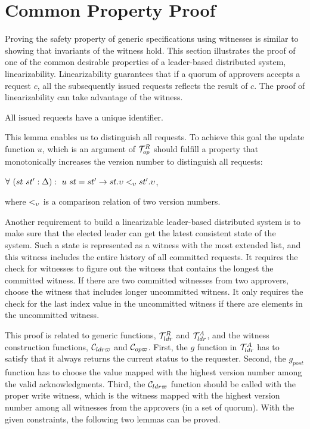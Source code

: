 \section{Common Property Proof}
\label{chapter:witnesspassing:sec:prove-safety-with-witness}

Proving the safety property of generic specifications using witnesses is similar to showing that invariants of the witness hold.
This section illustrates the proof of one of the common desirable properties
of a leader-based distributed system, linearizability.
Linearizability guarantees that if a quorum of approvers accepts a request $c$, 
all the subsequently issued requests reflects the result of $c$. 
The proof of linearizability can take advantage of the witness. 

\begin{lemma}
All issued requests have a unique identifier.
\end{lemma}

This lemma enables us to distinguish all requests. To achieve this goal the 
update function $u$, which is an argument of $\mathcal{T}^{R}_{op}$ should fulfill a 
property that monotonically increases the version number to distinguish all
requests:
\begin{center}
$\forall \ (st \ st' : \Delta) : \ u \ st = st' \rightarrow st.\upsilon
<_{\upsilon} st'.\upsilon$,
\end{center}
where $<_{\upsilon}$ is a comparison relation of two version numbers.


Another requirement to build a linearizable leader-based distributed system is to make sure that the elected leader can get the latest consistent
state of the system. Such a state is represented as a witness with the most extended list, and this witness includes the entire history of all committed requests. 
It requires the check for witnesses to figure out the witness that contains the longest the committed witness. If there are two committed witnesses from two approvers, choose the witness that includes longer uncommitted witness. It only requires the check for the last index value in the uncommitted witness if there are elements in the uncommitted witness.


This proof is related to generic functions, $\mathcal{T}^{R}_{ldr}$ and $\mathcal{T}^{A}_{ldr}$, 
and the witness construction functions, $\mathcal{C}_{ldr\varpi}$ and $\mathcal{C}_{op\varpi}$.
First, the $g$ function in $\mathcal{T}^{A}_{ldr}$ has to satisfy that  
it always returns the current status to the requester.
Second, the $g_{post}$ function has to choose the value mapped with the highest version number among the valid acknowledgments. 
Third, the $\mathcal{C}_{ldr\varpi}$ function should be called with the proper write witness, which is the witness mapped with the highest version number among all witnesses from the approvers (in a set of quorum).
With the given constraints, the following two lemmas can be proved.

